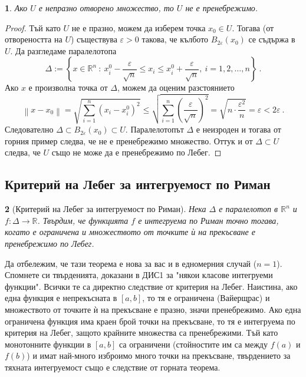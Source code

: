 \documentclass[11pt]{article}
\numberwithin{equation}{section}
\numberwithin{figure}{section}
\numberwithin{table}{section}
\theoremstyle{plain}
\newtheorem{thm}{\protect\theoremname}[section]
\theoremstyle{definition}
\theoremstyle{remark}
\theoremstyle{definition}
\theoremstyle{remark}
\theoremstyle{plain}
\theoremstyle{definition}
\theoremstyle{definition}
\theoremstyle{plain}
\theoremstyle{plain}
\newtheorem{prop}[thm]{\protect\propositionname}
\theoremstyle{plain}
\theoremstyle{definition}
\theoremstyle{plain}
\providecommand{\propositionname}{Твърдение}
\providecommand{\theoremname}{Теорема}
\newcommand*{\R}{\mathbb{R}}
\begin{document}
\begin{prop}
Ако $U$ е непразно отворено множество, то  $U$ не е пренебрежимо.
\end{prop}
\begin{proof}
Тъй като $U$ не е празно, можем да изберем точка $x_0\in U$. Тогава (от отвореността на $U$) съществува $\varepsilon >0$ такова, че кълбото $B_{2\varepsilon} (x_0)$ се съдържа в $U$. Да разгледаме паралелотопа 
$$\Delta := \left\{x\in\R^n \ : \  x_{i}^0 - \frac{\varepsilon}{\sqrt{n}} \leq x_i \leq  x_{i}^0 +\frac{\varepsilon}{\sqrt{n}}, \ i=1,2,\dots , n\right\} \ .$$
Ако $x$ е произволна точка от $\Delta$, можем да оценим разстоянието
$$\left\| x-x_0\right\| =\sqrt{\sum_{i=1}^n\left( x_i-x^0_i\right)^2} \le \sqrt{\sum_{i=1}^n\left(\frac{\varepsilon}{\sqrt{n}}\right)^2} =\sqrt{n \cdot \frac{\varepsilon^2}{n}}=\varepsilon <2\varepsilon\ .$$
 Следователно $\Delta \subset B_{2\varepsilon}(x_0)\subset U$. Паралелотопът $\Delta$ е неизроден и тогава от горния пример следва, че не е пренебрежимо множество. Оттук и от $\Delta \subset U$ следва, че $U$ също не може да е пренебрежимо по Лебег.
\end{proof}

\subsection{Критерий на Лебег за интегруемост по Риман}

\begin{thm}[Критерий на Лебег за интегруемост по Риман]
Нека $\Delta$ е паралелотоп в $\R^n$ и $f:\Delta \longrightarrow \R$. Твърдим, че функцията $f$ е интегруема по Риман точно тогава, когато е ограничена и 
множеството от точките \`{и} на прекъсване  е пренебрежимо по Лебег.
\end{thm}

\medskip
Да отбележим, че тази теорема е нова за вас и в едномерния случай ($n=1$). Спомнете си твърденията, доказани в ДИС1 за "някои класове интегруеми функции". Всички те са директно следствие от критерия на Лебег. Наистина, ако една функция е непрекъсната в $[a,b]$, то тя е ограничена (Вайерщрас) и множеството от точките \`{и} на прекъсване е празно, значи пренебрежимо. Ако една ограничена функция има краен брой точки на прекъсване, то тя е интегруема по критерия на Лебег, защото крайните множества са пренебрежими. Тъй като монотонните функции в $[a,b]$ са ограничени (стойностите им са между $f(a)$ и $f(b)$) и имат най-много изброимо много точки на прекъсване, твърдението за тяхната интегруемост също е следствие от горната теорема.
\medskip
\end{document}
